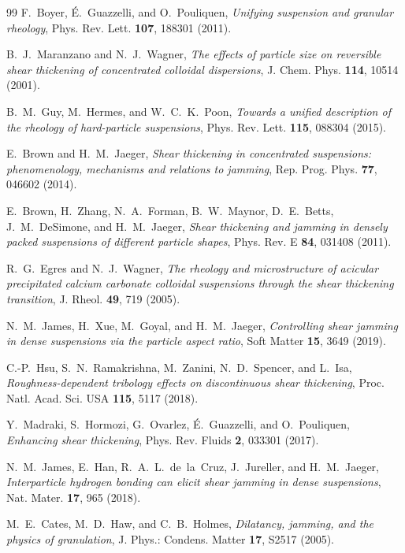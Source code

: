 \documentclass[11pt]{article}
\begin{document}
\begin{thebibliography}{99}
 F.~Boyer, \'E.~Guazzelli, and O.~Pouliquen, \emph{Unifying suspension and granular rheology}, Phys. Rev. Lett. \textbf{107}, 188301 (2011).

 B.~J.~Maranzano and N.~J.~Wagner, \emph{The effects of particle size on reversible shear thickening of concentrated colloidal dispersions}, J. Chem. Phys. \textbf{114}, 10514 (2001).

 B.~M.~Guy, M.~Hermes, and W.~C.~K.~Poon, \emph{Towards a unified description of the rheology of hard-particle suspensions}, Phys. Rev. Lett. \textbf{115}, 088304 (2015).

 E.~Brown and H.~M.~Jaeger, \emph{Shear thickening in concentrated suspensions: phenomenology, mechanisms and relations to jamming}, Rep. Prog. Phys. \textbf{77}, 046602 (2014).

 E.~Brown, H.~Zhang, N.~A.~Forman, B.~W.~Maynor, D.~E.~Betts, J.~M.~DeSimone, and H.~M.~Jaeger, \emph{Shear thickening and jamming in densely packed suspensions of different particle shapes}, Phys. Rev. E \textbf{84}, 031408 (2011).

 R.~G.~Egres and N.~J.~Wagner, \emph{The rheology and microstructure of acicular precipitated calcium carbonate colloidal suspensions through the shear thickening transition}, J. Rheol. \textbf{49}, 719 (2005).

 N.~M.~James, H.~Xue, M.~Goyal, and H.~M.~Jaeger, \emph{Controlling shear jamming in dense suspensions via the particle aspect ratio}, Soft Matter \textbf{15}, 3649 (2019).

 C.-P.~Hsu, S.~N.~Ram\-akrishna, M.~Zanini, N.~D.~Spencer, and L.~Isa, \emph{Roughness-dependent tribology effects on discontinuous shear thickening}, Proc. Natl. Acad. Sci. USA \textbf{115}, 5117 (2018).

 Y.~Madraki, S.~Hormozi, G.~Ovarlez, \'E.~Guazzelli, and O.~Pouliquen, \emph{Enhancing shear thickening}, Phys. Rev. Fluids \textbf{2}, 033301 (2017).

 N.~M.~James, E.~Han, R.~A.~L.~de~la~Cruz, J.~Jureller, and H.~M.~Jaeger, \emph{Interparticle hydrogen bonding can elicit shear jamming in dense suspensions}, Nat. Mater. \textbf{17}, 965 (2018).

 M.~E.~Cates, M.~D.~Haw, and C.~B.~Holmes, \emph{Dilatancy, jamming, and the physics of granulation}, J. Phys.: Condens. Matter \textbf{17}, S2517 (2005).


\end{thebibliography}
\end{document}
